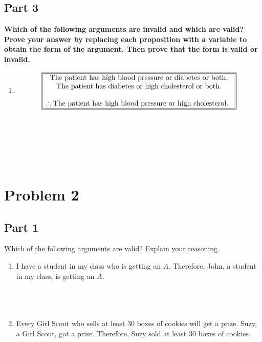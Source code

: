\documentclass{amsart}
\theoremstyle{definition}
\theoremstyle{Exercise}
\theoremstyle{remark}
\theoremstyle{rule}
\numberwithin{equation}{section}
\begin{document}
\subsection*{Part 3}
{\bf Which of the following arguments are invalid and which are valid? Prove your answer by replacing each proposition with a variable to obtain the form of the argument. Then prove that the form is valid or invalid.}\\
 \begin{enumerate}[label=(\alph*)]
  \item \[
\begin{array}{||c||}
\hline \hline
\text{The patient has high blood pressure or diabetes or both.}\\
\text {The patient has diabetes or high cholesterol or both.}\\
\\
\therefore \text {The patient has high blood pressure or high cholesterol.
}\\
\hline \hline
\end{array}
\]\\\\\
\\\\\

 
    \end{enumerate}
 \newpage

\section*{Problem 2}
\subsection*{Part 1}

 Which of the following arguments are valid? Explain your reasoning.\\
 \begin{enumerate}[label=(\alph*)]
\item I have a student in my class who is getting an $A$. Therefore, John, a student in my class, is getting an $A$. \\\\
\\\\
\item Every Girl Scout who sells at least 30 boxes of cookies will get a prize. Suzy, a Girl Scout, got a prize. Therefore, Suzy sold at least 30 boxes of cookies.\\\\
\\\\
 \end{enumerate}
\end{document}
